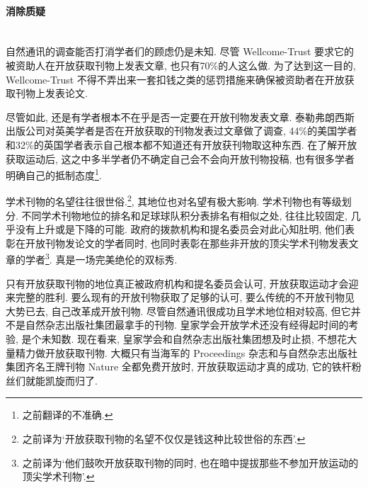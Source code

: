 \documentclass[a4paper, 12pt, UTF8]{article}
\begin{document}
\paragraph*{\large 消除质疑} \hspace{10pt} \\

自然通讯的调查能否打消学者们的顾虑仍是未知. 尽管 Wellcome-Trust 要求它的被资助人在开放获取刊物上发表文章, 也只有70\%的人这么做. 为了达到这一目的, Wellcome-Trust 不得不弄出来一套扣钱之类的惩罚措施来确保被资助者在开放获取刊物上发表论文.

尽管如此, 还是有学者根本不在乎是否一定要在开放刊物发表文章. 泰勒弗朗西斯出版公司对英美学者是否在开放获取的刊物发表过文章做了调查, 44\%的美国学者和32\%的英国学者表示自己根本都不知道还有开放获刊物取这种东西. 在了解开放获取运动后, 这之中多半学者仍不确定自己会不会向开放刊物投稿, 也有很多学者明确自己的抵制态度\footnote[9]{之前翻译的不准确.}.

学术刊物的名望往往很世俗.\footnote[10]{之前译为\lq 开放获取刊物的名望不仅仅是钱这种比较世俗的东西\rq.}, 其地位也对名望有极大影响. 学术刊物也有等级划分. 不同学术刊物地位的排名和足球球队积分表排名有相似之处, 往往比较固定, 几乎没有上升或是下降的可能. 政府的拨款机构和提名委员会对此心知肚明, 他们表彰在开放刊物发论文的学者同时, 也同时表彰在那些非开放的顶尖学术刊物发表文章的学者\footnote[11]{之前译为\lq 他们鼓吹开放获取刊物的同时, 也在暗中提拔那些不参加开放运动的顶尖学术刊物\rq.}. 真是一场完美绝伦的双标秀.

只有开放获取刊物的地位真正被政府机构和提名委员会认可, 开放获取运动才会迎来完整的胜利. 要么现有的开放刊物获取了足够的认可, 要么传统的不开放刊物见大势已去, 自己改革成开放刊物. 尽管自然通讯很成功且学术地位相对较高, 但它并不是自然杂志出版社集团最拿手的刊物. 皇家学会开放学术还没有经得起时间的考验, 是个未知数. 现在看来, 皇家学会和自然杂志出版社集团想及时止损, 不想花大量精力做开放获取刊物. 大概只有当海军的 Proceedings 杂志和与自然杂志出版社集团齐名王牌刊物 Nature 全都免费开放时, 开放获取运动才真的成功, 它的铁杆粉丝们就能凯旋而归了.
\end{document}
